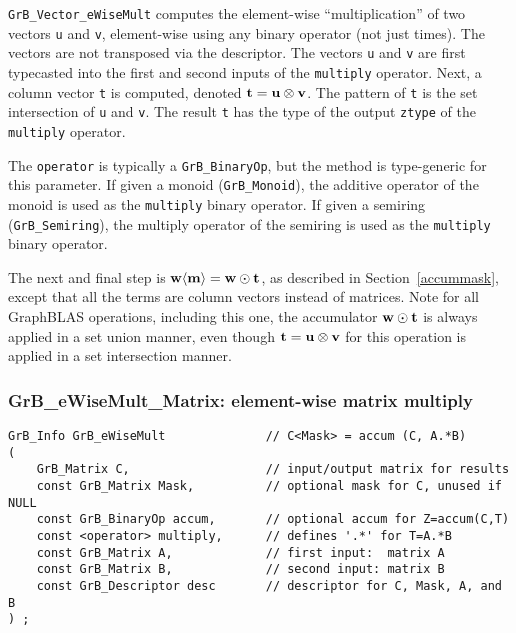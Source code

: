\documentclass[12pt]{article}
\begin{document}
\verb'GrB_Vector_eWiseMult' computes the element-wise ``multiplication'' of two
vectors \verb'u' and \verb'v', element-wise using any binary operator (not just
times).  The vectors are not transposed via the descriptor.  The vectors
\verb'u' and \verb'v' are first typecasted into the first and second inputs of
the \verb'multiply' operator.  Next, a column vector \verb't' is computed,
denoted ${\bf t = u \otimes v}$.  The pattern of \verb't' is the set
intersection of \verb'u' and \verb'v'.  The result \verb't' has the type of the
output \verb'ztype' of the \verb'multiply' operator.

The \verb'operator' is typically a \verb'GrB_BinaryOp', but the method is
type-generic for this parameter.  If given a monoid (\verb'GrB_Monoid'), the
additive operator of the monoid is used as the \verb'multiply' binary operator.
If given a semiring (\verb'GrB_Semiring'), the multiply operator of the
semiring is used as the \verb'multiply' binary operator.

The next and final step is ${\bf w \langle m \rangle  = w \odot t}$, as
described in Section~\ref{accummask}, except that all the terms are column
vectors instead of matrices.  Note for all GraphBLAS operations, including this
one, the accumulator ${\bf w \odot t}$ is always applied in a set union manner,
even though ${\bf t = u \otimes v}$ for this operation is applied in a set
intersection manner.

\newpage
\subsubsection{{\sf GrB\_eWiseMult\_Matrix:} element-wise matrix multiply}
\label{eWiseMult_matrix}

\begin{mdframed}[userdefinedwidth=6in]
{\footnotesize
\begin{verbatim}
GrB_Info GrB_eWiseMult              // C<Mask> = accum (C, A.*B)
(
    GrB_Matrix C,                   // input/output matrix for results
    const GrB_Matrix Mask,          // optional mask for C, unused if NULL
    const GrB_BinaryOp accum,       // optional accum for Z=accum(C,T)
    const <operator> multiply,      // defines '.*' for T=A.*B
    const GrB_Matrix A,             // first input:  matrix A
    const GrB_Matrix B,             // second input: matrix B
    const GrB_Descriptor desc       // descriptor for C, Mask, A, and B
) ;
\end{verbatim}
} \end{mdframed}
\end{document}
